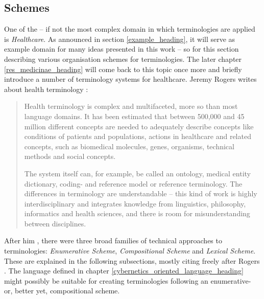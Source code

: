 %
%
%
%
%
%
%

\subsection{Schemes}
\label{schemes_heading}

One of the -- if not the most complex domain in which terminologies are applied
is \emph{Healthcare}. As announced in section \ref{example_heading}, it will
serve as example domain for many ideas presented in this work -- so for this
section describing various organisation schemes for terminologies. The later
chapter \ref{res_medicinae_heading} will come back to this topic once more and
briefly introduce a number of terminology systems for healthcare. Jeremy Rogers
writes about health terminology \cite{rogers2002}:

\begin{quote}
    Health terminology is complex and multifaceted, more so than most language
    domains. It has been estimated that between 500,000 and 45 million different
    concepts are needed to adequately describe concepts like conditions of
    patients and populations, actions in healthcare and related concepts, such as
    biomedical molecules, genes, organisms, technical methods and social concepts.

    The system itself can, for example, be called an ontology, medical entity
    dictionary, coding- and reference model or reference terminology. The
    differences in terminology are understandable -- this kind of work is highly
    interdisciplinary and integrates knowledge from linguistics, philosophy,
    informatics and health sciences, and there is room for misunderstanding
    between disciplines.
\end{quote}

After him \cite{rogers}, there were three broad families of technical approaches
to terminologies: \emph{Enumerative Scheme}, \emph{Compositional Scheme} and
\emph{Lexical Scheme}. These are explained in the following subsections, mostly
citing freely after Rogers \cite{rogers}. The language defined in chapter
\ref{cybernetics_oriented_language_heading} might possibly be suitable for
creating terminologies following an enumerative- or, better yet, compositional
scheme.




